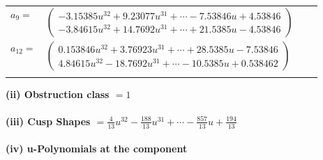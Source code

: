 \documentclass[1p]{elsarticle_modified}
\theoremstyle{definition}
\begin{document}
\begin{tabular}{m{7pt} m{180pt} m{7pt} m{180pt} }
\flushright $a_{9}=$&$\begin{pmatrix}-3.15385 u^{32}+9.23077 u^{31}+\cdots-7.53846 u+4.53846\\-3.84615 u^{32}+14.7692 u^{31}+\cdots+21.5385 u-4.53846\end{pmatrix}$ \\
\flushright $a_{12}=$&$\begin{pmatrix}0.153846 u^{32}+3.76923 u^{31}+\cdots+28.5385 u-7.53846\\4.84615 u^{32}-18.7692 u^{31}+\cdots-10.5385 u+0.538462\end{pmatrix}$\\&\end{tabular}
\flushleft \textbf{(ii) Obstruction class $= 1$}\\~\\
\flushleft \textbf{(iii) Cusp Shapes $= \frac{4}{13} u^{32}-\frac{188}{13} u^{31}+\cdots-\frac{857}{13} u+\frac{194}{13}$}\\~\\
\newpage\renewcommand{\arraystretch}{1}
\flushleft \textbf{(iv) u-Polynomials at the component}\newline \\
\end{document}
